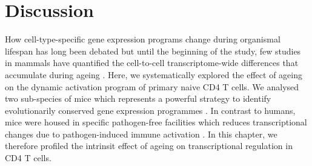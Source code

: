 
\section{Discussion}


How cell-type-specific gene expression programs change during organismal lifespan has long been debated \citep{Bahar2006, Warren2007} but until the beginning of the study, few studies in mammals have quantified the cell-to-cell transcriptome-wide differences that accumulate during ageing \citep{Kowalczyk2015}. Here, we systematically explored the effect of ageing on the dynamic activation program of primary naive CD4\plus{} T cells. We analysed two sub-species of mice which represents a powerful strategy to identify evolutionarily conserved gene expression programmes \citep{Shay2013}. In contrast to humans, mice were housed in specific pathogen-free facilities which reduces transcriptional changes due to pathogen-induced immune activation \citep{Beura2016}. In this chapter, we therefore profiled the intrinsit effect of ageing on transcriptional regulation in CD4\plus{} T cells.\\

